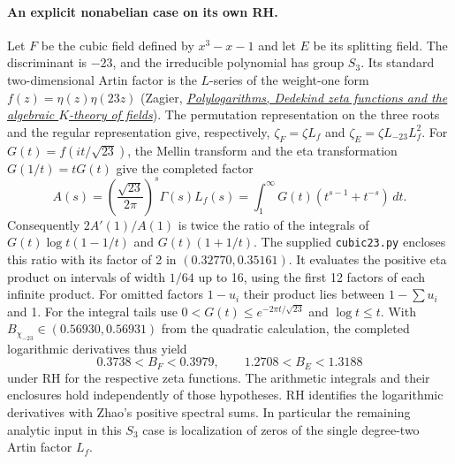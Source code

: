 \documentclass[11pt]{article}
\begin{document}
\paragraph{An explicit nonabelian case on its own RH.}
Let $F$ be the cubic field defined by $x^3-x-1$ and let $E$ be its splitting
field. The discriminant is $-23$, and the irreducible polynomial has group
$S_3$. Its standard two-dimensional Artin factor is the $L$-series of the
weight-one form $f(z)=\eta(z)\eta(23z)$ (Zagier,
\href{https://people.mpim-bonn.mpg.de/zagier/files/scanned/PolylogsDedekindZetaAndKTheory/fulltext.pdf}{\emph{Polylogarithms, Dedekind zeta functions and the algebraic $K$-theory of fields}}).
The permutation representation on the three roots and the regular representation
give, respectively, $\zeta_F=\zeta L_f$ and
$\zeta_E=\zeta L_{-23}L_f^2$. For $G(t)=f(it/\sqrt{23})$, the Mellin transform
and the eta transformation $G(1/t)=tG(t)$ give the completed factor
\[
 A(s)=\left(\frac{\sqrt{23}}{2\pi}\right)^s\Gamma(s)L_f(s)
     =\int_1^\infty G(t)(t^{s-1}+t^{-s})\,dt.
\]
Consequently $2A'(1)/A(1)$ is twice the ratio of the integrals of
$G(t)\log t(1-1/t)$ and $G(t)(1+1/t)$. The supplied
\texttt{cubic23.py} encloses this ratio with its factor of 2 in
$(0.32770,0.35161)$. It evaluates the positive eta product on intervals of
width $1/64$ up to 16, using the first 12 factors of each infinite product.
For omitted factors $1-u_i$ their product lies between $1-\sum u_i$ and 1.
For the integral tails use $0<G(t)\le e^{-2\pi t/\sqrt{23}}$ and $\log t\le t$.
With $B_{\chi_{-23}}\in(0.56930,0.56931)$ from the quadratic calculation,
the completed logarithmic derivatives thus yield
\[
           0.3738<B_F<0.3979,\qquad 1.2708<B_E<1.3188
\]
under RH for the respective zeta functions. The arithmetic integrals and
their enclosures hold independently of those hypotheses. RH identifies the
logarithmic derivatives with Zhao's positive spectral sums. In particular
the remaining analytic input in this $S_3$ case is localization of zeros of
the single degree-two Artin factor $L_f$.
\end{document}
